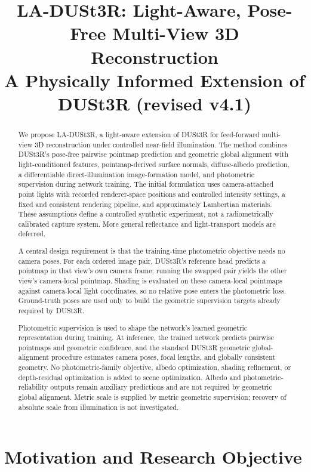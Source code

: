 \documentclass[11pt,a4paper]{article}
\title{\textbf{LA-DUSt3R: Light-Aware, Pose-Free Multi-View 3D Reconstruction}\\
\large A Physically Informed Extension of DUSt3R (revised v4.1)}
\author{}
\date{}
\begin{document}
\maketitle

\begin{abstract}
We propose LA-DUSt3R, a light-aware extension of DUSt3R for feed-forward
multi-view 3D reconstruction under controlled near-field illumination.
The method combines DUSt3R's pose-free pairwise pointmap prediction and
geometric global alignment with light-conditioned features, pointmap-derived
surface normals, diffuse-albedo prediction, a differentiable direct-illumination
image-formation model, and photometric supervision during network training.
The initial formulation uses camera-attached point lights with recorded
renderer-space positions and controlled intensity settings, a fixed and
consistent rendering pipeline, and approximately Lambertian materials.
These assumptions define a controlled synthetic experiment, not a
radiometrically calibrated capture system. More general reflectance and
light-transport models are deferred.

A central design requirement is that the training-time photometric objective
needs no camera poses. For each ordered image pair, DUSt3R's reference head
predicts a pointmap in that view's own camera frame; running the swapped pair
yields the other view's camera-local pointmap. Shading is evaluated on these
camera-local pointmaps against camera-local light coordinates, so no relative
pose enters the photometric loss. Ground-truth poses are used only to build
the geometric supervision targets already required by DUSt3R.

Photometric supervision is used to shape the network's learned geometric
representation during training. At inference, the trained network predicts
pairwise pointmaps and geometric confidence, and the standard DUSt3R geometric
global-alignment procedure estimates camera poses, focal lengths, and globally
consistent geometry. No photometric-family objective, albedo optimization,
shading refinement, or depth-residual optimization is added to scene
optimization. Albedo and photometric-reliability outputs remain auxiliary
predictions and are not required by geometric global alignment. Metric scale
is supplied by metric geometric supervision; recovery of absolute scale from
illumination is not investigated.
\end{abstract}

\tableofcontents

\section{Motivation and Research Objective}
\end{document}

